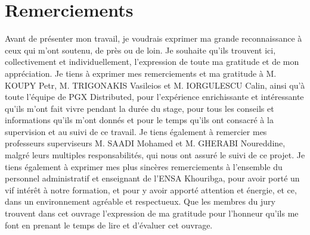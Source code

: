 \chapter*{Remerciements}
Avant de présenter mon travail, je voudrais exprimer ma grande reconnaissance à ceux qui m'ont soutenu,
de près ou de loin. Je souhaite qu'ils trouvent ici, collectivement et individuellement,
l'expression de toute ma gratitude et de mon appréciation. Je tiens à exprimer mes remerciements et ma gratitude
à M. KOUPY Petr, M. TRIGONAKIS Vasileios et M. IORGULESCU Calin, ainsi qu'à toute l'équipe de PGX Distributed,
pour l'expérience enrichissante et intéressante qu'ils m'ont fait vivre pendant la durée du stage,
pour tous les conseils et informations qu'ils m'ont donnés et pour le temps qu'ils ont consacré à la supervision
et au suivi de ce travail. Je tiens également à remercier mes professeurs superviseurs M. SAADI Mohamed et
M. GHERABI Noureddine, malgré leurs multiples responsabilités, qui nous ont assuré le suivi de ce projet.
Je tiens également à exprimer mes plus sincères remerciements à l'ensemble du personnel administratif et enseignant
de l'ENSA Khouribga, pour avoir porté un vif intérêt à notre formation, et pour y avoir apporté attention et énergie,
et ce, dans un environnement agréable et respectueux. Que les membres du jury trouvent dans cet ouvrage l'expression de ma gratitude pour
l'honneur qu'ils me font en prenant le temps de lire et d'évaluer cet ouvrage.